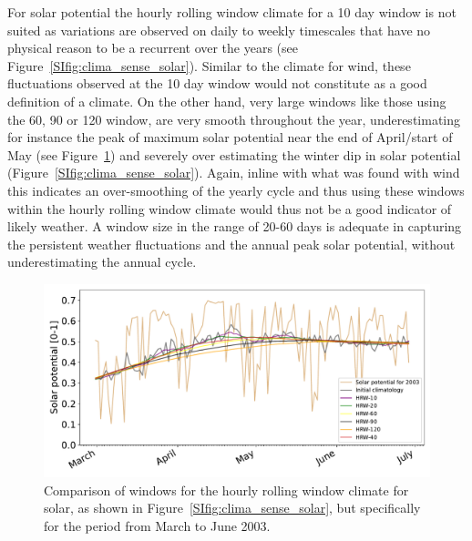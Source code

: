 \documentclass[12pt]{iopart}
\begin{document}
For solar potential the hourly rolling window climate for a 10 day window is not suited as variations are observed on daily to weekly timescales that have no physical reason to be a recurrent over the years (see Figure~\ref{SIfig:clima_sense_solar}). Similar to the climate for wind, these fluctuations observed at the 10 day window would not constitute as a good definition of a climate. On the other hand, very large windows like those using the 60, 90 or 120 window, are very smooth throughout the year, underestimating for instance the peak of maximum solar potential near the end of April/start of May (see Figure~\ref{SIfig:clima_sense_zoom_solar}) and severely over estimating the winter dip in solar potential (Figure~\ref{SIfig:clima_sense_solar}). Again, inline with what was found with wind this indicates an over-smoothing of the yearly cycle and thus using these windows within the hourly rolling window climate would thus not be a good indicator of likely weather. A window size in the range of 20-60 days is adequate in capturing the persistent weather fluctuations and the annual peak solar potential, without underestimating the annual cycle.


\begin{figure}[t]
    \centering
    \includegraphics[width=\textwidth]{Figures_SI/Climatology_sensitivity_zoom_solar.pdf}
    \caption{Comparison of windows for the hourly rolling window climate for solar, as shown in Figure~\ref{SIfig:clima_sense_solar}, but specifically for the period from March to June 2003.}
    \label{SIfig:clima_sense_zoom_solar}
\end{figure}
\end{document}
